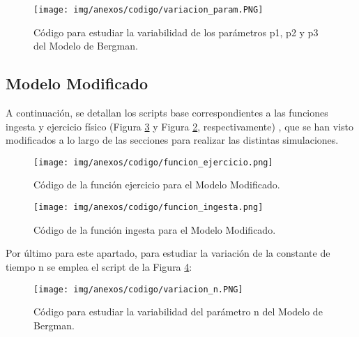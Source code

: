 \begin{figure}[htbp]
    \centering
    \texttt{[image: img/anexos/codigo/variacion\_param.PNG]}
    \caption{Código para estudiar la variabilidad de los parámetros p1, p2 y p3 del Modelo de Bergman.}
    \label{fig:script_var_param}
\end{figure}


\subsection{Modelo Modificado}

A continuación, se detallan los scripts base correspondientes a las funciones ingesta y ejercicio físico (Figura \ref{fig:script_ingesta} y Figura \ref{fig:script_ejercicio}, respectivamente) , que se han visto modificados a lo largo de las secciones para realizar las distintas simulaciones. 

\begin{figure}[htbp]
    \centering
    \texttt{[image: img/anexos/codigo/funcion\_ejercicio.png]}
    \caption{Código de la función ejercicio para el Modelo Modificado.}
    \label{fig:script_ejercicio}
\end{figure}
\clearpage
\begin{figure}[htbp]
    \centering
    \texttt{[image: img/anexos/codigo/funcion\_ingesta.png]}
    \caption{Código de la función ingesta para el Modelo Modificado.}
    \label{fig:script_ingesta}
\end{figure}

Por último para este apartado, para estudiar la variación de la constante de tiempo n se emplea el script de la Figura \ref{fig:script_n}:

\begin{figure}[htbp]
    \centering
    \texttt{[image: img/anexos/codigo/variacion\_n.PNG]}
    \caption{Código para estudiar la variabilidad del parámetro n del Modelo de Bergman.}
    \label{fig:script_n}
\end{figure}



